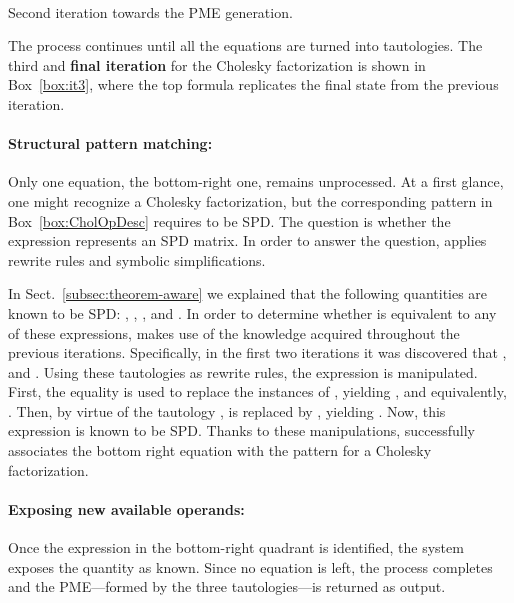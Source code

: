 \documentclass{llncs}
\newcommand{\click}{{\sc{Cl\makebox[.58\width][c]{1}ck}}}
\begin{document}
\begin{mybox}
{\begin{mybox}
{}
\\\vspace{1em}
\hspace{-.1cm}
\caption{Second iteration towards the PME generation.} \label{box:it2}
\end{mybox}


The process continues until all the equations are turned into tautologies.
The third and {\bf final iteration} for the Cholesky factorization
is shown in Box~\ref{box:it3}, where the top formula
replicates the final state from the previous iteration.

\paragraph{\bf Structural pattern matching:} Only one equation, the bottom-right one, remains unprocessed.  
At a first glance,
one might recognize a Cholesky factorization, but the corresponding
pattern in Box~\ref{box:CholOpDesc} requires  to be SPD. The question is whether the expression  represents an SPD matrix. In
order to answer the question, \click{} applies rewrite rules and
symbolic simplifications.

In Sect.~\ref{subsec:theorem-aware} we explained
that the following quantities are known to be SPD: , ,
, and .
In order to determine whether 
is equivalent to any of these expressions, \click{} makes use of the knowledge acquired throughout the previous iterations.
Specifically, in the first two iterations it was discovered that
, and .
Using these tautologies as rewrite rules, the expression  is manipulated.  First, the equality  is used to replace the instances of ,
yielding , and
equivalently, . Then, by virtue of the tautology ,
 is replaced by , yielding . Now, this expression is known to be SPD.
Thanks to these manipulations, \click{} successfully associates the
bottom right equation with the pattern for a Cholesky factorization.

\paragraph{\bf Exposing new available operands:} 
Once the expression in the bottom-right quadrant is identified, 
the system exposes the quantity  as known.
Since no equation is left, the process completes and the PME---formed by the three
tautologies---is returned as output. 

}
\end{mybox}
\end{document}
